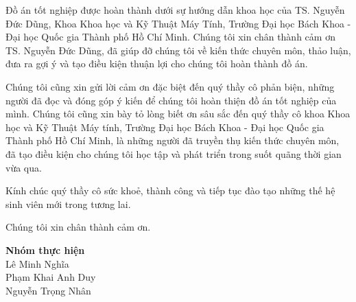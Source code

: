 \begin{acknowledgments}

    Đồ án tốt nghiệp được hoàn thành dưới sự hướng dẫn khoa học của TS. Nguyễn Đức Dũng, Khoa Khoa học và Kỹ Thuật Máy Tính, Trường Đại học Bách Khoa - Đại học Quốc gia Thành phố Hồ Chí Minh. Chúng tôi xin chân thành cảm ơn TS. Nguyễn Đức Dũng, đã giúp đỡ chúng tôi về kiến thức chuyên môn, thảo luận, đưa ra gợi ý và tạo điều kiện thuận lợi cho chúng tôi hoàn thành đồ án.

    Chúng tôi cũng xin gửi lời cảm ơn đặc biệt đến quý thầy cô phản biện, những người đã đọc và đóng góp ý kiến để chúng tôi hoàn thiện đồ án tốt nghiệp của mình. Chúng tôi cũng xin bày tỏ lòng biết ơn sâu sắc đến quý thầy cô khoa Khoa học và Kỹ Thuật Máy tính, Trường Đại học Bách Khoa - Đại học Quốc gia Thành phố Hồ Chí Minh, là những người đã truyền thụ kiến thức chuyên môn, đã tạo điều kiện cho chúng tôi học tập và phát triển trong suốt quãng thời gian vừa qua.

    Kính chúc quý thầy cô sức khoẻ, thành công và tiếp tục đào tạo những thế hệ sinh viên mới trong tương lai.

    Chúng tôi xin chân thành cảm ơn.

    \begin{flushright}
        \textbf{Nhóm thực hiện} \\
        Lê Minh Nghĩa \\
        Phạm Khai Anh Duy \\
        Nguyễn Trọng Nhân \\
    \end{flushright}

\end{acknowledgments}